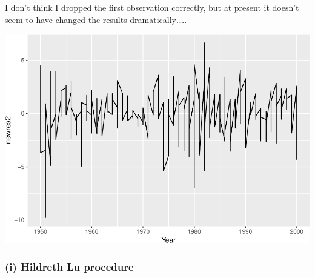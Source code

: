 \documentclass[11pt,]{article}
\newenvironment{Shaded}{\begin{snugshade}}{\end{snugshade}}
\newcommand{\KeywordTok}[1]{\textcolor[rgb]{0.13,0.29,0.53}{\textbf{#1}}}
\newcommand{\DataTypeTok}[1]{\textcolor[rgb]{0.13,0.29,0.53}{#1}}
\newcommand{\StringTok}[1]{\textcolor[rgb]{0.31,0.60,0.02}{#1}}
\newcommand{\CommentTok}[1]{\textcolor[rgb]{0.56,0.35,0.01}{\textit{#1}}}
\newcommand{\OperatorTok}[1]{\textcolor[rgb]{0.81,0.36,0.00}{\textbf{#1}}}
\newcommand{\NormalTok}[1]{#1}
\begin{document}
\begin{Shaded}
\end{Shaded}

I don't think I dropped the first observation correctly, but at present
it doesn't seem to have changed the results dramatically\ldots{}..

\begin{Shaded}
\end{Shaded}

\includegraphics{ps4_code_files/figure-latex/plot CO results-1.pdf}

\subsubsection{(i) Hildreth Lu procedure}\label{i-hildreth-lu-procedure}
\end{document}
